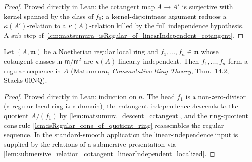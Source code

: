 \begin{proof}
  Proved directly in Lean: the cotangent map \(A \to A'\) is surjective with kernel
  spanned by the class of \(f_0\); a kernel-disjointness argument reduces a
  \(\kappa(A')\)-relation to a \(\kappa(A)\)-relation killed by the full independence
  hypothesis. A sub-step of
  \cref{lem:matsumura_isRegular_of_linearIndependent_cotangent}.
\end{proof}

\begin{lemma}
  \label{lem:matsumura_isRegular_of_linearIndependent_cotangent}
  Let \((A, \mathfrak m)\) be a Noetherian regular local ring and \(f_1,\dots,f_n \in
  \mathfrak m\) whose cotangent classes in \(\mathfrak m/\mathfrak m^2\) are
  \(\kappa(A)\)-linearly independent. Then \(f_1,\dots,f_n\) form a regular sequence in
  \(A\) (Matsumura, \emph{Commutative Ring Theory}, Thm.~14.2; Stacks 00NQ).
\end{lemma}

\begin{proof}
  Proved directly in Lean: induction on \(n\). The head \(f_1\) is a non-zero-divisor
  (a regular local ring is a domain), the cotangent independence descends to the
  quotient \(A/(f_1)\) by \cref{lem:matsumura_descent_cotangent}, and the
  ring-quotient cons rule \cref{lem:isRegular_cons_of_quotient_ring} reassembles the
  regular sequence. In the standard-smooth application the linear-independence input is
  supplied by the relations of a submersive presentation via
  \cref{lem:submersive_relation_cotangent_linearIndependent_localized}.
\end{proof}

